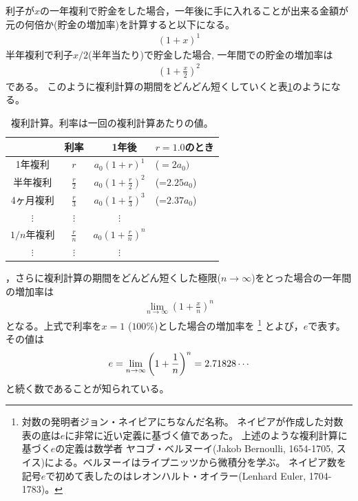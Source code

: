 \documentclass[twocolumn,11pt]{jarticle}
\begin{document}
利子が$x$の一年複利で貯金をした場合，一年後に手に入れることが出来る金額が元の何倍か(貯金の増加率)を計算すると以下になる。
\begin{align*}
  (1+x)^1
\end{align*}
半年複利で利子$x/2$(半年当たり)で貯金した場合, 一年間での貯金の増加率は
\begin{align*}
  \displaystyle \left(1+\frac{x}{2}\right)^2
\end{align*}
である。
このように複利計算の期間をどんどん短くしていくと表\ref{tab:money}のようになる。
{\small
\begin{table}[t]
  \centering
  \caption{複利計算。利率は一回の複利計算あたりの値。}
  \label{tab:money}
  \begin{tabular}[h]{|c|c|cl|}\hline
         & 利率                        &　1年後          & $r=1.0$のとき\\\hline
1年複利  & $r$                         & $a_0(1+r)^1$    & ($=2a_0)$ \\
半年複利 & $\displaystyle\frac{r}{2}$  & $\displaystyle a_0\left(1+\frac{r}{2}\right)^2$&(=$2.25a_0$)\\
4ヶ月複利& $\displaystyle\frac{r}{3}$  & $\displaystyle a_0\left(1+\frac{r}{3}\right)^3$&(=$2.37a_0$)\\
$\vdots$ & $\displaystyle\vdots$       & $\vdots$ & \\
$1/n$年複利 & $\displaystyle\frac{r}{n}$   & $\displaystyle a_0\left(1+\frac{r}{n}\right)^n$&\\
$\vdots$ & $\displaystyle\vdots$       & $\vdots$  &\\\hline
  \end{tabular}
\end{table}
}
，さらに複利計算の期間をどんどん短くした極限($n\to\infty$)をとった場合の一年間の増加率は
\begin{align}
	\label{eq:Napier-exp}
  \lim_{n\to\infty} \left( 1 + \frac{x}{n} \right)^n
  \end{align}
となる。上式で利率を$x=1$ ($100\%$)とした場合の増加率を
\footnote{対数の発明者ジョン・ネイピアにちなんだ名称。
ネイピアが作成した対数表の底は$e$に非常に近い定義に基づく値であった。
上述のような複利計算に基づく$e$の定義は数学者
{ヤコブ・ベルヌーイ}(Jakob Bernoulli, 1654-1705, スイス)による。ベルヌーイはライプニッツから微積分を学ぶ。
ネイピア数を記号$e$で初めて表したのはレオンハルト・オイラー(Lenhard Euler, 1704-1783)。
}
とよび，$e$で表す。その値は
\begin{align}
e=\lim_{n\to\infty}\left(1+\frac{1}{n}\right)^{n}=2.71828\cdots\notag
\end{align}
と続く数であることが知られている。
\end{document}
